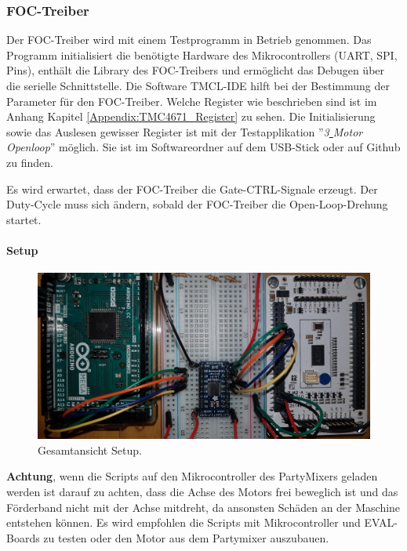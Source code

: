 \subsubsection{FOC-Treiber}
\label{subsubsec:Inbetriebnahme_FOC_Treiber}
Der FOC-Treiber wird mit einem Testprogramm in Betrieb genommen. Das Programm initialisiert die benötigte Hardware des Mikrocontrollers (UART, SPI, Pins), enthält die Library des FOC-Treibers und ermöglicht das Debugen über die serielle Schnittstelle. Die Software TMCL-IDE hilft bei der Bestimmung der Parameter für den FOC-Treiber. Welche Register wie beschrieben sind ist im Anhang Kapitel \ref{Appendix:TMC4671_Register} zu sehen. Die Initialisierung sowie das Auslesen gewisser Register ist mit der Testapplikation ''\textit{3\underline{ }Motor\underline{ }Openloop}'' möglich. Sie ist im Softwareordner auf dem USB-Stick oder auf Github \cite{aebi_projekt-6softwareatmega_2020} zu finden.

Es wird erwartet, dass der FOC-Treiber die Gate-CTRL-Signale erzeugt. Der Duty-Cycle muss sich ändern, sobald der FOC-Treiber die Open-Loop-Drehung startet.
\newpage
\paragraph{Setup}\mbox{}

\begin{figure}[H]
	\centering
	\includegraphics[angle=270,width=0.8 \textwidth]{graphics/1_komplett}
	\caption{Gesamtansicht Setup.}
	\label{fig:1_komplett}
\end{figure}

\textbf{Achtung}, wenn die Scripts auf den Mikrocontroller des PartyMixers geladen werden ist darauf zu achten, dass die Achse des Motors frei beweglich ist und das Förderband nicht mit der Achse mitdreht, da ansonsten Schäden an der Maschine entstehen können. Es wird empfohlen die Scripts mit Mikrocontroller und EVAL-Boards zu testen oder den Motor aus dem Partymixer auszubauen.

